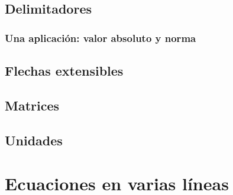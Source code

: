 \documentclass{article}
\numberwithin{equation}{section}
\DeclarePairedDelimiter\abs{\lvert}{\rvert}
\DeclarePairedDelimiter\norma{\lVert}{\rVert}
\theoremstyle{plain}
\theoremstyle{definition}
\theoremstyle{remark}
\begin{document}


\subsection{Delimitadores}


\subsubsection*{Una aplicación: valor absoluto y norma}







\subsection{Flechas extensibles}



\subsection{Matrices}




\subsection{Unidades}



\section{Ecuaciones en varias líneas}



\end{document}
